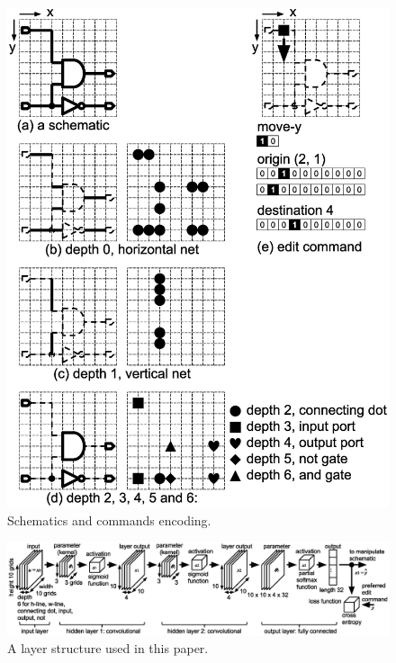 \documentclass[twocolumn]{article}
\begin{document}
\begin{figure}[!tp]
 \begin{center}
  \begin{minipage}{\hsize}
   \includegraphics[width=\hsize]{fig/encode_02.eps}
   \caption{Schematics and commands encoding.}
   \label{fig:encode}
  \end{minipage}
 \end{center}
\end{figure}

\begin{figure}[!tp]
 \begin{center}
  \begin{minipage}{\hsize}
   \includegraphics[width=\hsize]{fig/layers_06.eps}
   \caption{A layer structure used in this paper.}
   \label{fig:layers}
  \end{minipage}
 \end{center}
\end{figure}
\end{document}
